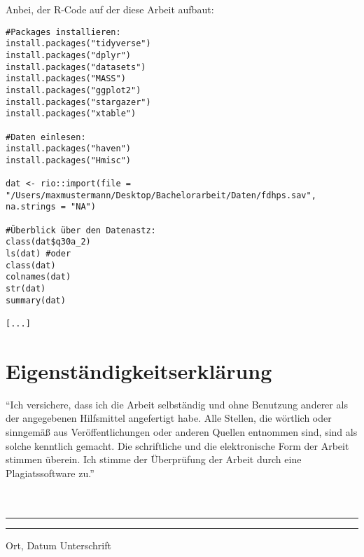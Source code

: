 \documentclass[12pt, a4paper, oneside]{article}
\begin{document}
Anbei, der R-Code auf der diese Arbeit aufbaut:
\begin{tiny}
\begin{lstlisting}
#Packages installieren:
install.packages("tidyverse")
install.packages("dplyr")
install.packages("datasets")
install.packages("MASS")
install.packages("ggplot2")
install.packages("stargazer")
install.packages("xtable")

#Daten einlesen:
install.packages("haven")
install.packages("Hmisc") 

dat <- rio::import(file = 
"/Users/maxmustermann/Desktop/Bachelorarbeit/Daten/fdhps.sav",
na.strings = "NA")

#Überblick über den Datenastz:
class(dat$q30a_2)
ls(dat) #oder
class(dat)
colnames(dat)
str(dat)
summary(dat)

[...]
\end{lstlisting}
\end{tiny}

\newpage

\section{Eigenständigkeitserklärung}
``Ich versichere, dass ich die Arbeit selbständig und ohne Benutzung anderer als der angegebenen Hilfsmittel angefertigt habe. Alle Stellen, die wörtlich oder sinngemäß aus Veröffentlichungen oder anderen Quellen entnommen sind, sind als solche kenntlich gemacht. Die schriftliche und die elektronische Form der Arbeit stimmen überein. Ich stimme der Überprüfung der Arbeit durch eine Plagiatssoftware zu.''
\paragraph{}$~~$\\
\paragraph{}$~~$\\
\vspace{50pt} 
\noindent\rule{5cm}{.4pt}\hfill\rule{5cm}{.4pt}\par 
\noindent Ort, Datum \hfill Unterschrift 
\end{document}

